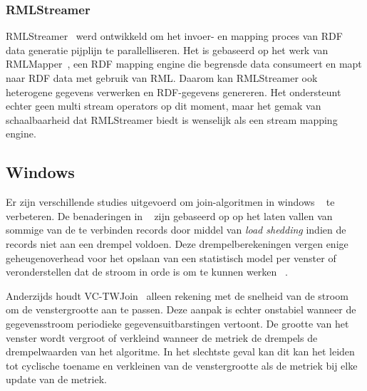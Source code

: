 \subsubsection{RMLStreamer}
RMLStreamer~\cite{rml_streamer}
werd ontwikkeld om het invoer- en mapping proces van RDF data generatie pijplijn te parallelliseren. 
Het is gebaseerd op het werk van RMLMapper~\cite{rml}, een RDF mapping engine die begrensde data consumeert en mapt naar RDF data met gebruik van RML. Daarom kan RMLStreamer ook 
heterogene gegevens verwerken en RDF-gegevens genereren. Het ondersteunt echter geen 
multi stream operators op dit moment, maar het gemak van schaalbaarheid dat RMLStreamer biedt
is wenselijk als een stream mapping engine. 


\subsection{Windows}
Er zijn verschillende studies uitgevoerd om 
join-algoritmen in windows ~\cite{vctw_join, join_tracking, grubjoin, approximate_window_sem, approx_window} te verbeteren. 
De benaderingen in ~\cite{grubjoin, approximate_window_sem, approx_window} zijn gebaseerd op 
op het laten vallen van sommige van de te verbinden records door middel van \emph{load shedding} indien de 
records niet aan een drempel voldoen. Deze drempelberekeningen vergen enige 
geheugenoverhead voor het opslaan van een statistisch model per venster of 
veronderstellen dat de stroom in orde is om te kunnen werken
~\cite{grubjoin, approximate_window_sem, approx_window}.

Anderzijds houdt VC-TWJoin~\cite{vctw_join} alleen rekening met de snelheid van de 
stroom om de venstergrootte aan te passen. 
Deze aanpak is echter onstabiel wanneer de gegevensstroom periodieke gegevensuitbarstingen vertoont.
De grootte van het venster wordt vergroot of verkleind wanneer de metriek de drempels 
de drempelwaarden van het algoritme. In het slechtste geval kan dit 
kan het leiden tot cyclische toename en 
verkleinen van de venstergrootte als de metriek bij elke 
update van de metriek.




